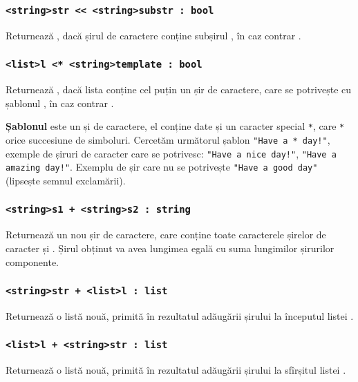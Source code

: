\subsubsection{\lstinline|<string>str << <string>substr : bool|}

Returnează \true{}, dacă șirul de caractere  conține subșirul , în caz contrar \false{}.

\subsubsection{\lstinline|<list>l <* <string>template : bool|}

Returnează \true{}, dacă lista  conține cel puțin un șir de caractere, care se potrivește cu șablonul , în caz contrar \false{}.

{\bf Șablonul} este un și de caractere, el conține date și un caracter special \lstinline|*|, care \lstinline|*| orice succesiune de simboluri. Cercetăm următorul șablon \lstinline|"Have a * day!"|, exemple de șiruri de caracter care se potrivesc: \lstinline|"Have a nice day!"|, \lstinline|"Have a amazing day!"|. Exemplu de șir care nu se potrivește \lstinline|"Have a good day"| (lipsește semnul exclamării).

\subsubsection{\lstinline|<string>s1 + <string>s2 : string|}

Returnează un nou șir de caractere, care conține toate caracterele șirelor de caracter  și . Șirul obținut va avea lungimea egală cu suma lungimilor șirurilor componente.

\subsubsection{\lstinline|<string>str + <list>l : list|}

Returnează o listă nouă, primită în rezultatul adăugării șirului  la începutul listei .

\subsubsection{\lstinline|<list>l + <string>str : list|}

Returnează o listă nouă, primită în rezultatul adăugării șirului  la sfîrșitul listei .

